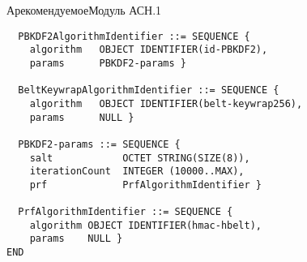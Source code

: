 \begin{appendix}{А}{рекомендуемое}{Модуль АСН.1}
\begin{verbatim}
  PBKDF2AlgorithmIdentifier ::= SEQUENCE {
    algorithm   OBJECT IDENTIFIER(id-PBKDF2),
    params      PBKDF2-params }
  
  BeltKeywrapAlgorithmIdentifier ::= SEQUENCE {
    algorithm   OBJECT IDENTIFIER(belt-keywrap256),
    params      NULL }

  PBKDF2-params ::= SEQUENCE {
    salt            OCTET STRING(SIZE(8)),
    iterationCount  INTEGER (10000..MAX),
    prf             PrfAlgorithmIdentifier }
  
  PrfAlgorithmIdentifier ::= SEQUENCE {
    algorithm OBJECT IDENTIFIER(hmac-hbelt), 
    params    NULL }
END
\end{verbatim}

\end{appendix}
  